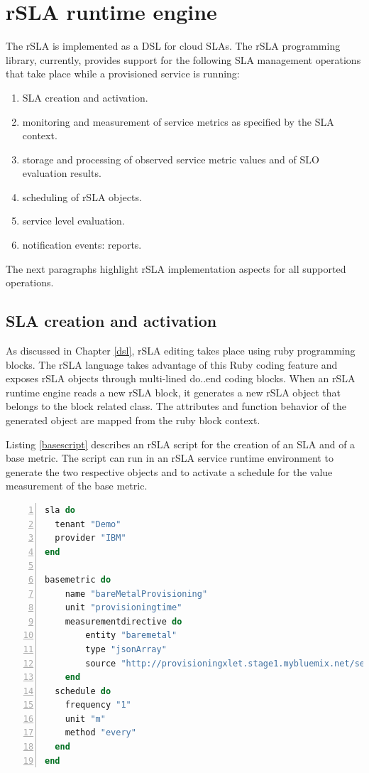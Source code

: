 \section{rSLA runtime engine}\label{runtime}

The rSLA is implemented as a DSL for cloud SLAs. The rSLA programming library, currently, provides support for the following SLA management operations that take place while a provisioned service is running:
\begin{enumerate}
\item SLA creation and activation.
\item monitoring and measurement of service metrics as specified by the SLA context.
\item storage and processing of observed service metric values and of SLO evaluation results. 
\item scheduling of rSLA objects.
\item service level evaluation.
\item notification events: reports.
\end{enumerate}
The next paragraphs highlight rSLA implementation aspects for all supported operations.

\subsection{SLA creation and activation}

As discussed in Chapter \ref{dsl}, rSLA editing takes place using ruby programming blocks. The rSLA language takes advantage of this Ruby coding feature and exposes rSLA objects through multi-lined do..end coding blocks. When an rSLA runtime engine reads a new rSLA block, it generates a new rSLA object that belongs to the block related class. The attributes and function behavior of the generated object are mapped from the ruby block context. 

Listing \ref{basescript} describes an rSLA script for the creation of an SLA and of a base metric. The script can run in an rSLA service runtime environment to generate the two respective objects and to activate a schedule for the value measurement of the base metric.

\begin{minipage}{0.9\textwidth}
\begin{lstlisting}[language=Ruby, basicstyle=\small\normalfont\sffamily, breaklines=true,  captionpos=b, mathescape=true, caption=rSLA SLA (lines 1-4) and basemetric (lines 6-19) creation script, label=basescript, numbers=left, numbersep=5pt, numberstyle=\tiny] 
sla do
  tenant "Demo"
  provider "IBM"
end  

basemetric do
    name "bareMetalProvisioning"
    unit "provisioningtime"
    measurementdirective do
    	entity "baremetal"
    	type "jsonArray"
    	source "http://provisioningxlet.stage1.mybluemix.net/server/baremetal/provisioningtime" 
  	end
  schedule do    
  	frequency "1"
    unit "m"
    method "every"
  end
end
\end{lstlisting}
\end{minipage} 

